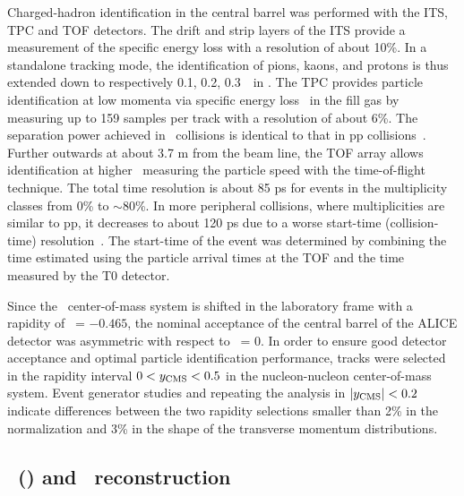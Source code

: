 Charged-hadron identification in the central barrel was performed with the ITS, TPC and TOF detectors. The drift and strip layers of the ITS provide a measurement of the specific energy loss with a resolution of about 10\%. In a standalone tracking mode, the identification of pions, kaons, and protons is thus extended down to respectively 0.1, 0.2, 0.3~\gevc\ in \pt. The TPC provides particle identification at low momenta via specific energy loss \dedx\ in the fill gas by measuring up to 159 samples per track with a resolution of about 6\%. The separation power achieved in \pPb\ collisions is identical to that in pp collisions~\cite{Abelev:2014ffa}. Further outwards at about 3.7 m from the beam line, the TOF array allows identification at higher \pt\ measuring the particle speed with the time-of-flight technique. The total time resolution is about 85 ps for events in the multiplicity classes from 0\% to $\sim 80$\%.  In more peripheral collisions, where multiplicities are similar to pp, it decreases to about 120 ps due to a worse start-time (collision-time) resolution~\cite{Abelev:2014ffa}. The start-time of the event was determined by combining the time estimated using the particle arrival times at the TOF and the time measured by the T0 detector.

Since the \pPb\ center-of-mass system is shifted in the laboratory frame with a rapidity of \ynn\ = $-0.465$, the nominal acceptance of the central barrel of the ALICE detector was asymmetric with respect to \ycms\ = 0.  In order to ensure good detector acceptance and optimal particle identification performance, tracks were selected in the rapidity interval $0 < y_{\rm CMS} < 0.5$ in the nucleon-nucleon center-of-mass system. Event generator studies and repeating the analysis in $\left|y_{\rm CMS}\right| < 0.2$ indicate differences between the two rapidity selections smaller than 2\% in the normalization and 3\% in the shape of the transverse momentum distributions.


\subsection{\lda\ (\alda) and \ks\ reconstruction}
\label{sec:V0Reco}

